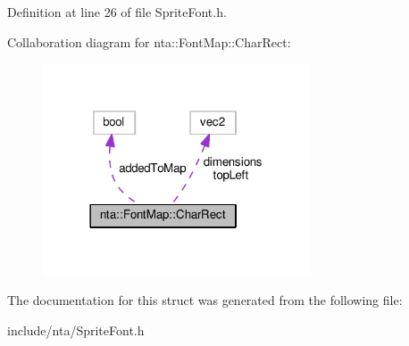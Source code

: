 Definition at line 26 of file Sprite\+Font.\+h.



Collaboration diagram for nta\+:\+:Font\+Map\+:\+:Char\+Rect\+:\nopagebreak
\begin{figure}[H]
\begin{center}
\leavevmode
\includegraphics[width=225pt]{de/df1/structnta_1_1FontMap_1_1CharRect__coll__graph}
\end{center}
\end{figure}


The documentation for this struct was generated from the following file\+:\begin{DoxyCompactItemize}
\item 
include/nta/Sprite\+Font.\+h\end{DoxyCompactItemize}
